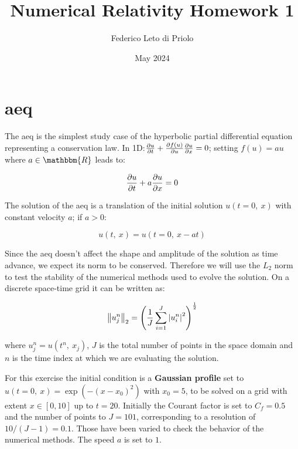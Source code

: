 \documentclass[11pt, a4paper]{article}
\title{Numerical Relativity Homework 1}
\author{Federico Leto di Priolo}
\date{May 2024}
\begin{document}
\maketitle

\section{\acrfull{aeq}}

The \acrshort{aeq} is the simplest study case of the hyperbolic partial differential equation representing a conservation law. In 1D:\(\pdv{u}{t} + \pdv{f(u)}{u} \pdv{u}{x} = 0\); setting \(f(u) = au\) where \(a \in \mathbbm{R}\) leads to:

\begin{equation} \label{eq:adv_eq}
    \pdv{u}{t} + a \pdv{u}{x} = 0
\end{equation}

\noindent
The solution of the \acrshort{aeq} is a translation of the initial solution \(u(t = 0,\ x)\) with constant velocity \(a\); if \(a > 0\):

\begin{equation} \label{eq:adv_sol}
    u(t,\ x) = u(t = 0,\ x - at)
\end{equation}

Since the \acrshort{aeq} doesn't affect the shape and amplitude of the solution as time advance, we expect its norm to be conserved. Therefore we will use the \(L_2\) norm to test the stability of the numerical methods used to evolve the solution. On a discrete space-time grid it can be written as:

\begin{equation} \label{eq:l2_norm}
    \norm{u^n_j}_2 = \qty(\frac{1}{J} \sum_{i = 1}^J \abs{u^n_i}^2)^\frac{1}{2}
\end{equation}

\noindent
where \(u^n_j = u(t^n,\ x_j)\), \(J\) is the total number of points in the space domain and \(n\) is the time index at which we are evaluating the solution.

For this exercise the initial condition is a \textbf{Gaussian profile} set to \(u(t = 0,\ x) = \exp(-(x - x_0)^2)\) with \(x_0 = 5\), to be solved on a grid with extent \(x \in [0, 10]\) up to \(t = 20\). Initially the Courant factor is set to \(C_f = 0.5\) and the number of points to \(J = 101\), corresponding to a resolution of \(10 / (J - 1) = 0.1\). Those have been varied to check the behavior of the numerical methods. The speed \(a\) is set to \(1\).
\end{document}
